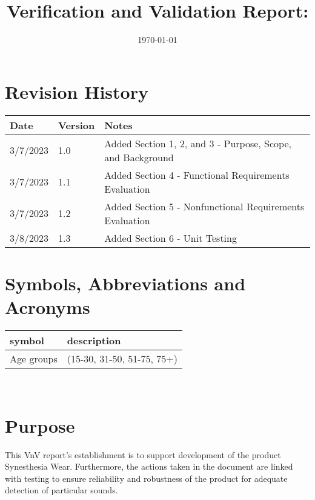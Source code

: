 \documentclass[12pt, titlepage]{article}
\begin{document}
\title{Verification and Validation Report: \progname} 
\author{\authname}
\date{\today}
	
\maketitle


\section*{Revision History}

\begin{tabularx}{\textwidth}{p{3cm}p{2cm}X}
\toprule {\bf Date} & {\bf Version} & {\bf Notes}\\
\midrule
3/7/2023 & 1.0 & Added Section 1, 2, and 3 - Purpose, Scope, and Background\\
3/7/2023 & 1.1 & Added Section 4 - Functional Requirements Evaluation\\
3/7/2023 & 1.2 & Added Section 5 - Nonfunctional Requirements Evaluation\\
3/8/2023 & 1.3 & Added Section 6 - Unit Testing\\
\bottomrule
\end{tabularx}

\newpage

\tableofcontents

\listoftables

\newpage

\section*{Symbols, Abbreviations and Acronyms}


\renewcommand{\arraystretch}{1.2}
\begin{tabular}{l l} 
  \toprule		
  \textbf{symbol} & \textbf{description}\\
  \midrule 
  Age groups & (15-30, 31-50, 51-75, 75+)\\
  \bottomrule
\end{tabular}\\

\newpage


\section{Purpose}

This VnV report's establishment is to support development of the product Synesthesia Wear. Furthermore, the actions taken in the document are linked with testing to ensure reliability and robustness of the product for adequate detection of particular sounds.
\end{document}
